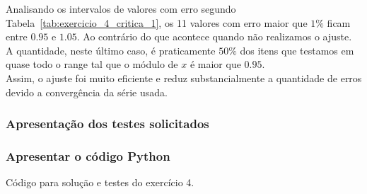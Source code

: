 Analisando os intervalos de valores com erro segundo Tabela~\ref{tab:exercicio_4_critica_1}, os 11 valores com erro maior que $1 \%$ ficam entre $0.95$ e $1.05$.
Ao contrário do que acontece quando não realizamos o ajuste. A quantidade, neste último caso, é praticamente $50 \%$ dos itens que testamos em quase todo o range tal que o módulo de $x$ é maior que $0.95$.\\
Assim, o ajuste foi muito eficiente e reduz substancialmente a quantidade de erros devido a convergência da série usada.

\subsubsection{Apresentação dos testes solicitados}
    

\subsubsection{Apresentar o código Python}
    
    Código para solução e testes do exercício 4.
